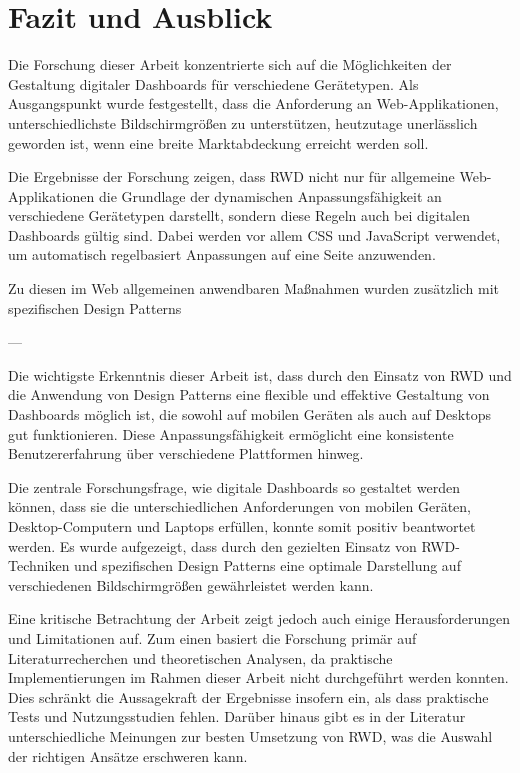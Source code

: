 \section{Fazit und Ausblick}\label{sec:fazit-ausblick}

Die Forschung dieser Arbeit konzentrierte sich auf die Möglichkeiten der Gestaltung digitaler Dashboards für verschiedene Gerätetypen.
Als Ausgangspunkt wurde festgestellt, dass die Anforderung an Web-Applikationen, unterschiedlichste Bildschirmgrößen zu unterstützen, heutzutage unerlässlich geworden ist, wenn eine breite Marktabdeckung erreicht werden soll.

Die Ergebnisse der Forschung zeigen, dass \ac{RWD} nicht nur für allgemeine Web-Applikationen die Grundlage der dynamischen Anpassungsfähigkeit an verschiedene Gerätetypen darstellt, sondern diese Regeln auch bei digitalen Dashboards gültig sind.
Dabei werden vor allem \ac{CSS} und JavaScript verwendet, um automatisch regelbasiert Anpassungen auf eine Seite anzuwenden.

Zu diesen im Web allgemeinen anwendbaren Maßnahmen wurden zusätzlich mit spezifischen Design Patterns

---

Die wichtigste Erkenntnis dieser Arbeit ist, dass durch den Einsatz von \ac{RWD} und die Anwendung von Design Patterns eine flexible und effektive Gestaltung von Dashboards möglich ist, die sowohl auf mobilen Geräten als auch auf Desktops gut funktionieren.
Diese Anpassungsfähigkeit ermöglicht eine konsistente Benutzererfahrung über verschiedene Plattformen hinweg.

Die zentrale Forschungsfrage, wie digitale Dashboards so gestaltet werden können, dass sie die unterschiedlichen Anforderungen von mobilen Geräten, Desktop-Computern und Laptops erfüllen, konnte somit positiv beantwortet werden.
Es wurde aufgezeigt, dass durch den gezielten Einsatz von \ac{RWD}-Techniken und spezifischen Design Patterns eine optimale Darstellung auf verschiedenen Bildschirmgrößen gewährleistet werden kann.


Eine kritische Betrachtung der Arbeit zeigt jedoch auch einige Herausforderungen und Limitationen auf.
Zum einen basiert die Forschung primär auf Literaturrecherchen und theoretischen Analysen, da praktische Implementierungen im Rahmen dieser Arbeit nicht durchgeführt werden konnten.
Dies schränkt die Aussagekraft der Ergebnisse insofern ein, als dass praktische Tests und Nutzungsstudien fehlen.
Darüber hinaus gibt es in der Literatur unterschiedliche Meinungen zur besten Umsetzung von \ac{RWD}, was die Auswahl der richtigen Ansätze erschweren kann.


